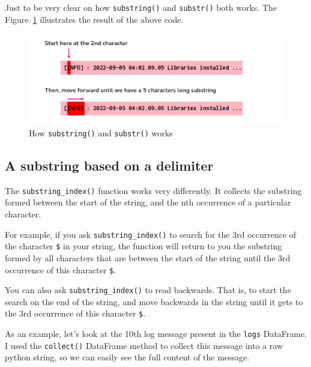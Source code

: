 \documentclass[
  11pt,
  letterpaper,
  DIV=11,
  numbers=noendperiod]{scrreprt}
\begin{document}
Just to be very clear on how \texttt{substring()} and \texttt{substr()}
both works. The Figure~\ref{fig-substring-start-length} illustrates the
result of the above code.

\begin{figure}

{\centering \includegraphics{Chapters/./../Figures/substring-start-length.png}

}

\caption{\label{fig-substring-start-length}How \texttt{substring()} and
\texttt{substr()} works}

\end{figure}

\hypertarget{a-substring-based-on-a-delimiter}{%
\subsection{A substring based on a
delimiter}\label{a-substring-based-on-a-delimiter}}

The \texttt{substring\_index()} function works very differently. It
collects the substring formed between the start of the string, and the
nth occurrence of a particular character.

For example, if you ask \texttt{substring\_index()} to search for the
3rd occurrence of the character \texttt{\$} in your string, the function
will return to you the substring formed by all characters that are
between the start of the string until the 3rd occurrence of this
character \texttt{\$}.

You can also ask \texttt{substring\_index()} to read backwards. That is,
to start the search on the end of the string, and move backwards in the
string until it gets to the 3rd occurrence of this character
\texttt{\$}.

As an example, let's look at the 10th log message present in the
\texttt{logs} DataFrame. I used the \texttt{collect()} DataFrame method
to collect this message into a raw python string, so we can easily see
the full content of the message.
\end{document}

